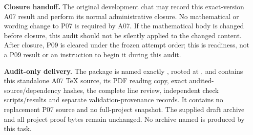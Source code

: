 \documentclass[11pt]{article}
\begin{document}
\textbf{Closure handoff.} The original development chat may record this
exact-version A07 result and perform its normal administrative closure.
No mathematical or wording change to P07 is required by A07. If the
mathematical body is changed before closure, this audit should not be
silently applied to the changed content. After closure, P09 is cleared
under the frozen attempt order; this is readiness, not a P09 result or
an instruction to begin it during this audit.

\textbf{Audit-only delivery.} The package is named exactly
, rooted at
, and contains this standalone A07 TeX
source, its PDF reading copy, exact audited-source/dependency hashes,
the complete line review, independent check scripts/results and
separate validation-provenance records. It contains no replacement P07
source and no full-project snapshot. The supplied draft archive and all
project proof bytes remain unchanged. No archive named
 is produced by this task.
\end{document}
